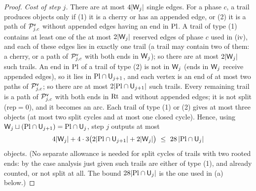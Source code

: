 \begin{proof}
\emph{Cost of step $j$.} There are at most $4|\mathsf{W}_j|$ single edges. For a phase $c$, a trail produces objects only if
(1) it is a cherry or has an appended edge, or (2) it is a path of $\mathcal{P}^{\mathsf{v}}_{j,c}$ without appended edges having an
end in $\mathrm{Pl}$. A trail of type (1) contains at least one of the at most $2|\mathsf{W}_j|$ reserved edges of phase $c$ used in
(iv), and each of these edges lies in exactly one trail (a trail may contain two of them: a cherry, or a path of
$\mathcal{P}^{\mathsf{v}}_{j,c}$ with both ends in $\mathsf{W}_j$); so there are at most $2|\mathsf{W}_j|$ such trails. An end in $\mathrm{Pl}$ of a trail of type (2) is not in $\mathsf{W}_j$ (ends in $\mathsf{W}_j$ receive appended edges), so it
lies in $\mathrm{Pl}\cap\mathsf{U}_{j+1}$, and each vertex is an end of at most two paths of $\mathcal{P}^{\mathsf{v}}_{j,c}$; so there are at most
$2|\mathrm{Pl}\cap\mathsf{U}_{j+1}|$ such trails. Every remaining trail is a path of $\mathcal{P}^{\mathsf{v}}_{j,c}$ with both ends in $\mathrm{Rt}$ and
without appended edges; it is not split ($\mathrm{rep}=0$), and it becomes an arc. Each trail of type (1) or (2) gives
at most three objects (at most two split cycles and at most one closed cycle). Hence, using
$\mathsf{W}_j\sqcup(\mathrm{Pl}\cap\mathsf{U}_{j+1})=\mathrm{Pl}\cap\mathsf{U}_j$, step $j$ outputs at most
\begin{equation}\label{s4:eqPVstep}
4|\vW_j|+4\cdot3\bigl(2|\Pl\cap\vU_{j+1}|+2|\vW_j|\bigr)\ \le\ 28\,|\Pl\cap\vU_j|
\end{equation}
objects. (No separate allowance is needed for split cycles of trails with two rooted ends: by the case analysis
just given such trails are either of type (1), and already counted, or not split at all. The bound
$28|\mathrm{Pl}\cap\mathsf{U}_j|$ is the one used in (a) below.)


\end{proof}
